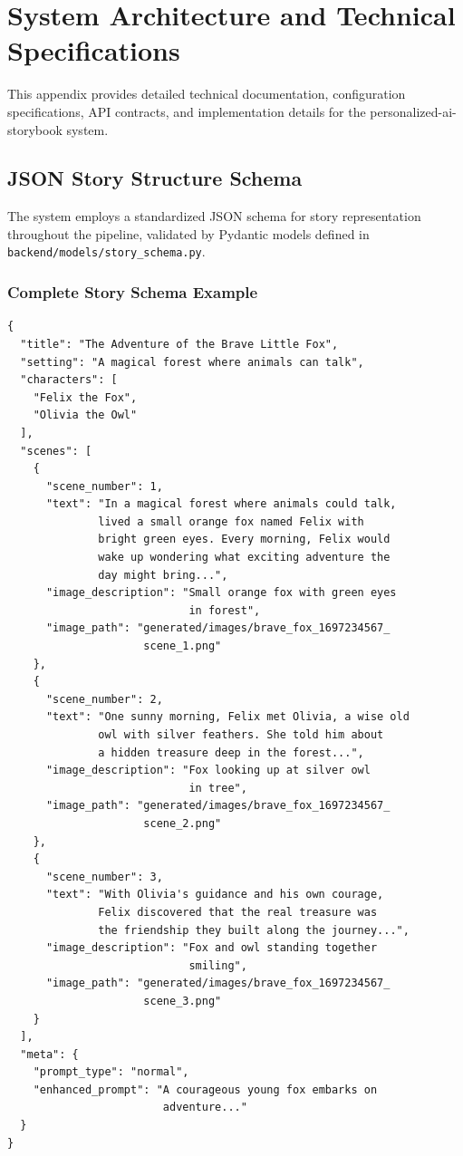 \appendix
\chapter{System Architecture and Technical Specifications}

This appendix provides detailed technical documentation, configuration specifications, API contracts, and implementation details for the personalized-ai-storybook system.

\section{JSON Story Structure Schema}

The system employs a standardized JSON schema for story representation throughout the pipeline, validated by Pydantic models defined in \texttt{backend/models/story\_schema.py}.

\subsection{Complete Story Schema Example}

\begin{verbatim}
{
  "title": "The Adventure of the Brave Little Fox",
  "setting": "A magical forest where animals can talk",
  "characters": [
    "Felix the Fox",
    "Olivia the Owl"
  ],
  "scenes": [
    {
      "scene_number": 1,
      "text": "In a magical forest where animals could talk, 
              lived a small orange fox named Felix with 
              bright green eyes. Every morning, Felix would 
              wake up wondering what exciting adventure the 
              day might bring...",
      "image_description": "Small orange fox with green eyes 
                            in forest",
      "image_path": "generated/images/brave_fox_1697234567_
                     scene_1.png"
    },
    {
      "scene_number": 2,
      "text": "One sunny morning, Felix met Olivia, a wise old 
              owl with silver feathers. She told him about 
              a hidden treasure deep in the forest...",
      "image_description": "Fox looking up at silver owl 
                            in tree",
      "image_path": "generated/images/brave_fox_1697234567_
                     scene_2.png"
    },
    {
      "scene_number": 3,
      "text": "With Olivia's guidance and his own courage, 
              Felix discovered that the real treasure was 
              the friendship they built along the journey...",
      "image_description": "Fox and owl standing together 
                            smiling",
      "image_path": "generated/images/brave_fox_1697234567_
                     scene_3.png"
    }
  ],
  "meta": {
    "prompt_type": "normal",
    "enhanced_prompt": "A courageous young fox embarks on 
                        adventure..."
  }
}
\end{verbatim}

